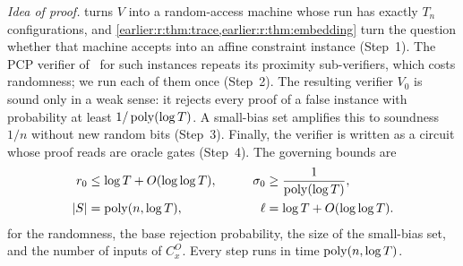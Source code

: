 \emph{Idea of proof.}  turns \(V\) into a random-access
machine whose run has exactly \(T_n\) configurations, and
\cref{earlier:r:thm:trace,earlier:r:thm:embedding} turn the question whether that machine
accepts into an affine constraint instance (Step~1). The PCP verifier
of~\cite{BCGT13} for such
instances repeats its proximity sub-verifiers, which costs randomness;
we run each of them once (Step~2). The resulting verifier \(V_0\) is
sound only in a weak sense: it rejects every proof of a false instance
with probability at least \(1/\operatorname{poly}(\log T)\). A small-bias set amplifies this to soundness
\(1/n\) without new random bits (Step~3). Finally, the verifier is
written as a circuit whose proof reads are oracle gates (Step~4). The
governing bounds are
\[
 \begin{aligned}
 r_0&\le\log T+O(\log\log T),&\qquad
 \sigma_0&\ge\frac1{\operatorname{poly}(\log T)},\\
 \left|S\right|&=\operatorname{poly}(n,\log T),&
 \ell&=\log T+O(\log\log T).
 \end{aligned}
\]
for the randomness, the base rejection probability, the size of the
small-bias set, and the number of inputs of \(C^O_x\). Every step runs
in time \(\operatorname{poly}(n,\log T)\).

